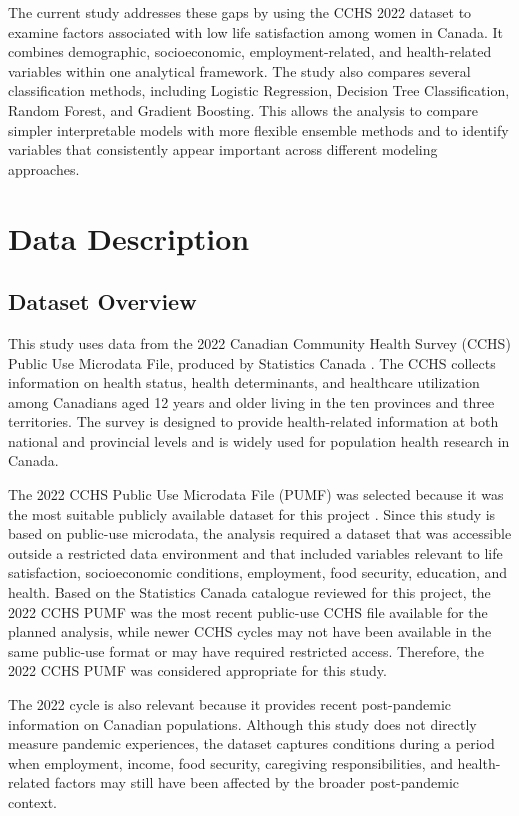 \documentclass[12pt]{article}
\begin{document}
The current study addresses these gaps by using the CCHS 2022 dataset to examine factors associated with low life satisfaction among women in Canada. It combines demographic, socioeconomic, employment-related, and health-related variables within one analytical framework. The study also compares several classification methods, including Logistic Regression, Decision Tree Classification, Random Forest, and Gradient Boosting. This allows the analysis to compare simpler interpretable models with more flexible ensemble methods and to identify variables that consistently appear important across different modeling approaches.


\section{Data Description}

\subsection{Dataset Overview}

This study uses data from the 2022 Canadian Community Health Survey
(CCHS) Public Use Microdata File, produced by Statistics Canada
\citep{statcan2024cchs}. The CCHS collects information on health status, health determinants, and healthcare utilization among Canadians aged 12 years and older living in the ten provinces and three territories. The survey is designed to provide health-related information at both national and provincial levels and is widely used for population health research in Canada.

The 2022 CCHS Public Use Microdata File (PUMF) was selected because it
was the most suitable publicly available dataset for this project
\citep{statcan2024cchs}. Since this study is based on public-use microdata, the analysis required a dataset that was accessible outside a restricted data environment and that included variables relevant to life satisfaction, socioeconomic conditions, employment, food security, education, and health. Based on the Statistics Canada catalogue reviewed for this project, the 2022 CCHS PUMF was the most recent public-use CCHS file available for the planned analysis, while newer CCHS cycles may not have been available in the same public-use format or may have required restricted access. Therefore, the 2022 CCHS PUMF was considered appropriate for this study.

The 2022 cycle is also relevant because it provides recent post-pandemic information on Canadian populations. Although this study does not directly measure pandemic experiences, the dataset captures conditions during a period when employment, income, food security, caregiving responsibilities, and health-related factors may still have been affected by the broader post-pandemic context.
\end{document}
